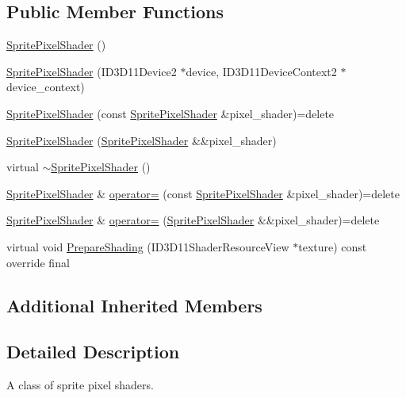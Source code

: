 \subsection*{Public Member Functions}
\begin{DoxyCompactItemize}
\item 
\hyperlink{classmage_1_1_sprite_pixel_shader_a27c14557bf08f15d321c5dd728b3343d}{Sprite\+Pixel\+Shader} ()
\item 
\hyperlink{classmage_1_1_sprite_pixel_shader_abffbb811fa7b34e538748ae5d082aec4}{Sprite\+Pixel\+Shader} (I\+D3\+D11\+Device2 $\ast$device, I\+D3\+D11\+Device\+Context2 $\ast$device\+\_\+context)
\item 
\hyperlink{classmage_1_1_sprite_pixel_shader_a5803ea69e04c58528f9c4fbbc0f4efbc}{Sprite\+Pixel\+Shader} (const \hyperlink{classmage_1_1_sprite_pixel_shader}{Sprite\+Pixel\+Shader} \&pixel\+\_\+shader)=delete
\item 
\hyperlink{classmage_1_1_sprite_pixel_shader_a1507191b6574cc1fb499b4995f73edfe}{Sprite\+Pixel\+Shader} (\hyperlink{classmage_1_1_sprite_pixel_shader}{Sprite\+Pixel\+Shader} \&\&pixel\+\_\+shader)
\item 
virtual \hyperlink{classmage_1_1_sprite_pixel_shader_a0e2a3f2b52417ebffc56db3739bdd0c2}{$\sim$\+Sprite\+Pixel\+Shader} ()
\item 
\hyperlink{classmage_1_1_sprite_pixel_shader}{Sprite\+Pixel\+Shader} \& \hyperlink{classmage_1_1_sprite_pixel_shader_adf6e6f0872406b9df46cb87731ed1ae0}{operator=} (const \hyperlink{classmage_1_1_sprite_pixel_shader}{Sprite\+Pixel\+Shader} \&pixel\+\_\+shader)=delete
\item 
\hyperlink{classmage_1_1_sprite_pixel_shader}{Sprite\+Pixel\+Shader} \& \hyperlink{classmage_1_1_sprite_pixel_shader_ad982c266c5ba3510009a3f5e7519e284}{operator=} (\hyperlink{classmage_1_1_sprite_pixel_shader}{Sprite\+Pixel\+Shader} \&\&pixel\+\_\+shader)=delete
\item 
virtual void \hyperlink{classmage_1_1_sprite_pixel_shader_a8c0c4daf36c74822a772b1a38e8d876a}{Prepare\+Shading} (I\+D3\+D11\+Shader\+Resource\+View $\ast$texture) const override final
\end{DoxyCompactItemize}
\subsection*{Additional Inherited Members}


\subsection{Detailed Description}
A class of sprite pixel shaders. 

